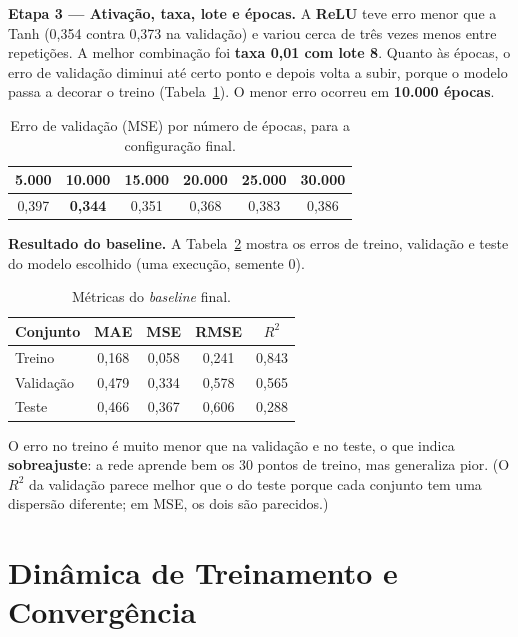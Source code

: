 \documentclass[11pt,a4paper]{article}
\begin{document}
\textbf{Etapa 3 --- Ativação, taxa, lote e épocas.} A \textbf{ReLU} teve erro menor que a Tanh (0,354 contra 0,373 na validação) e variou cerca de três vezes menos entre repetições. A melhor combinação foi \textbf{taxa 0,01 com lote 8}. Quanto às épocas, o erro de validação diminui até certo ponto e depois volta a subir, porque o modelo passa a decorar o treino (Tabela~\ref{tab:epocas}). O menor erro ocorreu em \textbf{10.000 épocas}.

\begin{table}[h]
\centering
\small
\caption{Erro de validação (MSE) por número de épocas, para a configuração final.}
\label{tab:epocas}
\begin{tabular}{cccccc}
\toprule
\textbf{5.000} & \textbf{10.000} & \textbf{15.000} & \textbf{20.000} & \textbf{25.000} & \textbf{30.000} \\
\midrule
0,397 & \textbf{0,344} & 0,351 & 0,368 & 0,383 & 0,386 \\
\bottomrule
\end{tabular}
\end{table}

\textbf{Resultado do baseline.} A Tabela~\ref{tab:baseline_final} mostra os erros de treino, validação e teste do modelo escolhido (uma execução, semente 0).

\begin{table}[h]
\centering
\small
\caption{Métricas do \textit{baseline} final.}
\label{tab:baseline_final}
\begin{tabular}{lcccc}
\toprule
\textbf{Conjunto} & \textbf{MAE} & \textbf{MSE} & \textbf{RMSE} & \textbf{$R^2$} \\
\midrule
Treino & 0,168 & 0,058 & 0,241 & 0,843 \\
Validação & 0,479 & 0,334 & 0,578 & 0,565 \\
Teste & 0,466 & 0,367 & 0,606 & 0,288 \\
\bottomrule
\end{tabular}
\end{table}

O erro no treino é muito menor que na validação e no teste, o que indica \textbf{sobreajuste}: a rede aprende bem os 30 pontos de treino, mas generaliza pior. (O $R^2$ da validação parece melhor que o do teste porque cada conjunto tem uma dispersão diferente; em MSE, os dois são parecidos.)

\section{Dinâmica de Treinamento e Convergência}
\end{document}
